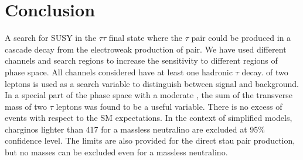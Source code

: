 \section{Conclusion}
\label{sect:conclusion}
A search for SUSY in the $\tau\tau$ final state where the
$\tau$ pair could be produced in a cascade decay from the electroweak production of \PSGcpDo pair.
We have used different channels and search regions to increase the sensitivity to
different regions of phase space. All channels considered have at least one hadronic $\tau$ decay.
 \mttwo of two leptons is used as a search variable to
distinguish between signal and background. In a special part of the phase space with
a moderate \mttwo, the sum of the transverse mass of two $\tau$ leptons was found to be a
useful variable.
There is no excess of events with respect to the SM expectations.
In the context of simplified models, charginos lighter than 417\GeV 
for a massless neutralino  are excluded at 95\% confidence level.
The limits are also provided for the direct stau pair production, but no masses  can be excluded 
even for a massless neutralino.

